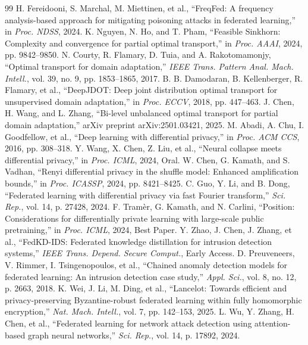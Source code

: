 \documentclass{ieeeaccess}
\theoremstyle{plain}
\theoremstyle{definition}
\theoremstyle{remark}
\begin{document}
\begin{thebibliography}{99}
 H. Fereidooni, S. Marchal, M. Miettinen, et al., ``FreqFed: A frequency analysis-based approach for mitigating poisoning attacks in federated learning,'' in \textit{Proc. NDSS}, 2024.
 K. Nguyen, N. Ho, and T. Pham, ``Feasible Sinkhorn: Complexity and convergence for partial optimal transport,'' in \textit{Proc. AAAI}, 2024, pp. 9842--9850.
 N. Courty, R. Flamary, D. Tuia, and A. Rakotomamonjy, ``Optimal transport for domain adaptation,'' \textit{IEEE Trans. Pattern Anal. Mach. Intell.}, vol. 39, no. 9, pp. 1853--1865, 2017.
 B. B. Damodaran, B. Kellenberger, R. Flamary, et al., ``DeepJDOT: Deep joint distribution optimal transport for unsupervised domain adaptation,'' in \textit{Proc. ECCV}, 2018, pp. 447--463.
 J. Chen, H. Wang, and L. Zhang, ``Bi-level unbalanced optimal transport for partial domain adaptation,'' arXiv preprint arXiv:2501.03421, 2025.
 M. Abadi, A. Chu, I. Goodfellow, et al., ``Deep learning with differential privacy,'' in \textit{Proc. ACM CCS}, 2016, pp. 308--318.
 Y. Wang, X. Chen, Z. Liu, et al., ``Neural collapse meets differential privacy,'' in \textit{Proc. ICML}, 2024, Oral.
 W. Chen, G. Kamath, and S. Vadhan, ``Renyi differential privacy in the shuffle model: Enhanced amplification bounds,'' in \textit{Proc. ICASSP}, 2024, pp. 8421--8425.
 C. Guo, Y. Li, and B. Dong, ``Federated learning with differential privacy via fast Fourier transform,'' \textit{Sci. Rep.}, vol. 14, p. 27428, 2024.
 F. Tram\`{e}r, G. Kamath, and N. Carlini, ``Position: Considerations for differentially private learning with large-scale public pretraining,'' in \textit{Proc. ICML}, 2024, Best Paper.
 Y. Zhao, J. Chen, J. Zhang, et al., ``FedKD-IDS: Federated knowledge distillation for intrusion detection systems,'' \textit{IEEE Trans. Depend. Secure Comput.}, Early Access.
 D. Preuveneers, V. Rimmer, I. Tsingenopoulos, et al., ``Chained anomaly detection models for federated learning: An intrusion detection case study,'' \textit{Appl. Sci.}, vol. 8, no. 12, p. 2663, 2018.
 K. Wei, J. Li, M. Ding, et al., ``Lancelot: Towards efficient and privacy-preserving Byzantine-robust federated learning within fully homomorphic encryption,'' \textit{Nat. Mach. Intell.}, vol. 7, pp. 142--153, 2025.
 L. Wu, Y. Zhang, H. Chen, et al., ``Federated learning for network attack detection using attention-based graph neural networks,'' \textit{Sci. Rep.}, vol. 14, p. 17892, 2024.

\end{thebibliography}
\end{document}
